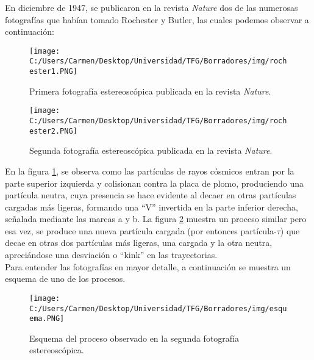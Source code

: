 En diciembre de 1947, se publicaron en la revista \textit{Nature} dos de las numerosas fotografías que habían tomado Rochester y Butler, las cuales podemos observar a continuación:



\begin{figure}[h]
	\centering
	\texttt{[image: C:/Users/Carmen/Desktop/Universidad/TFG/Borradores/img/rochester1.PNG]}
	\caption[Fotografía 1 de la primera detección de los mesones K]
	{Primera fotografía estereoscópica publicada en la revista \textit{Nature}.}
	\label{fig:nature1}
\end{figure}

\begin{figure}[h]
	\centering
	\texttt{[image: C:/Users/Carmen/Desktop/Universidad/TFG/Borradores/img/rochester2.PNG]}
	\caption[Fotografía 2 de la primera detección de los mesones K]
	{Segunda fotografía estereoscópica publicada en la revista \textit{Nature}.
	\protect\footnotemark}
	\label{fig:nature2}
\end{figure}


En la figura \ref{fig:nature1}, se observa como las partículas de rayos cósmicos entran por la parte superior izquierda y colisionan contra la placa de plomo, produciendo una partícula neutra, cuya presencia se hace evidente al decaer en otras partículas cargadas más ligeras, formando una ``V'' invertida en la parte inferior derecha, señalada mediante las marcas a y b. La figura \ref{fig:nature2} muestra un proceso similar pero esa vez, se produce una nueva partícula cargada (por entonces partícula-$\tau$) que decae en otras dos partículas más ligeras, una cargada y la otra neutra, apreciándose una desviación o ``kink'' en las trayectorias.\\

Para entender las fotografías en mayor detalle, a continuación se muestra un esquema de uno de los procesos.

\begin{figure}[h]
	\centering
	\texttt{[image: C:/Users/Carmen/Desktop/Universidad/TFG/Borradores/img/esquema.PNG]}
	\caption[Esquema para entender las fotos estereoscópicas]
	{Esquema del proceso observado en la segunda fotografía estereoscópica.
	\protect\footnotemark}
	\label{fig:esquema1}
\end{figure}

